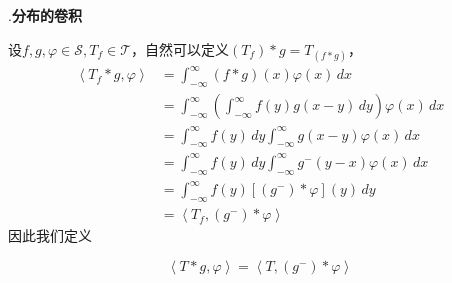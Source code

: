 \documentclass{ctexbook}
\begin{document}
.\textbf{分布的卷积}

设$f,g,\varphi\in\mathcal{S} ,T_f\in\mathcal{T} $，自然可以定义$(T_f)*g=T_{(f*g)}$，
\begin{align*}
    \left\langle T_f*g,\varphi\right\rangle & =\int_{-\infty}^{\infty}(f*g)(x)\varphi(x)\,dx                                           \\
                                 & =\int_{-\infty}^{\infty}\left(\int_{-\infty}^{\infty}f(y)g(x-y)\,dy\right)\varphi(x)\,dx \\
                                 & =\int_{-\infty}^{\infty}f(y)\,dy\int_{-\infty}^{\infty}g(x-y)\varphi(x)\,dx              \\
                                 & =\int_{-\infty}^{\infty}f(y)\,dy\int_{-\infty}^{\infty}g^- (y-x)\varphi(x)\,dx           \\
                                 & =\int_{-\infty}^{\infty}f(y)[(g^-) *\varphi](y)\,dy                                      \\
                                 & =\left\langle T_f,(g^-)*\varphi\right\rangle
\end{align*}
因此我们定义\begin{definition}[分布与函数的卷积]
    \[\left\langle T*g,\varphi\right\rangle=\left\langle T,(g^-)*\varphi\right\rangle\]
\end{definition}
\end{document}

